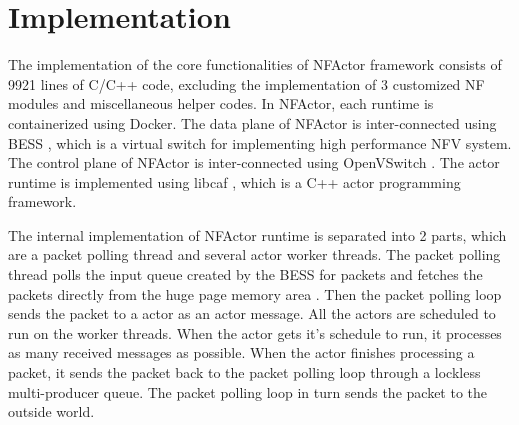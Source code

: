 \section{Implementation}
\label{sec:implementation}



The implementation of the core functionalities of NFActor framework consists of 9921 lines of C/C++ code, excluding the implementation of 3 customized NF modules and miscellaneous helper codes. In NFActor, each runtime is containerized using Docker. The data plane of NFActor is inter-connected using BESS \cite{Han:EECS-2015-155}, which is a virtual switch for implementing high performance NFV system. The control plane of NFActor is inter-connected using OpenVSwitch \cite{pfaff2015design}. The actor runtime is implemented using libcaf \cite{caf}, which is a C++ actor programming framework. 

The internal implementation of NFActor runtime is separated into 2 parts, which are a packet polling thread and several actor worker threads. The packet polling thread polls the input queue created by the BESS for packets and fetches the packets directly from the huge page memory area \cite{dpdk}. Then the packet polling loop sends the packet to a actor as an actor message. All the actors are scheduled to run on the worker threads. When the actor gets it's schedule to run, it processes as many received messages as possible. When the actor finishes processing a packet, it sends the packet back to the packet polling loop through a lockless multi-producer queue. The packet polling loop in turn sends the packet to the outside world. 



